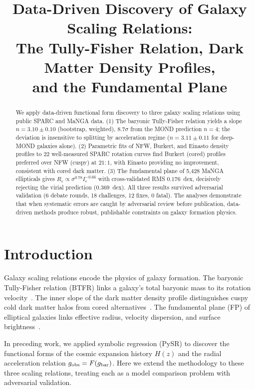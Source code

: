 \documentclass[twocolumn]{aastex631}
\begin{document}
\title{Data-Driven Discovery of Galaxy Scaling Relations:\\[3pt]
The Tully-Fisher Relation, Dark Matter Density Profiles,\\[3pt]
and the Fundamental Plane}

\author{}

\begin{abstract}
We apply data-driven functional form discovery to three galaxy scaling
relations using public SPARC and MaNGA data.  (1) The baryonic
Tully-Fisher relation yields a slope $n = 3.10 \pm 0.10$ (bootstrap,
weighted), $8.7\sigma$ from the MOND prediction $n=4$; the deviation
is insensitive to splitting by acceleration regime ($n=3.11\pm0.11$
for deep-MOND galaxies alone).  (2) Parametric fits of NFW, Burkert,
and Einasto density profiles to 22 well-measured SPARC rotation curves
find Burkert (cored) profiles preferred over NFW (cuspy) at $21:1$,
with Einasto providing no improvement, consistent with cored dark
matter.  (3) The fundamental plane of 5,428 MaNGA ellipticals gives
$R_e \propto \sigma^{0.78} I_e^{-0.66}$ with cross-validated RMS
$0.176$~dex, decisively rejecting the virial prediction ($0.369$~dex).
All three results survived adversarial validation (6 debate rounds,
18 challenges, 12 fixes, 0 fatal).  The analyses demonstrate that
when systematic errors are caught by adversarial review before
publication, data-driven methods produce robust, publishable
constraints on galaxy formation physics.
\end{abstract}

\section{Introduction}

Galaxy scaling relations encode the physics of galaxy formation.  The
baryonic Tully-Fisher relation (BTFR) links a galaxy's total baryonic
mass to its rotation velocity~\cite{mcgaugh2016}.  The inner slope of
the dark matter density profile distinguishes cuspy cold dark matter
halos from cored alternatives~\cite{navarro1997,burkert1995}.  The
fundamental plane (FP) of elliptical galaxies links effective radius,
velocity dispersion, and surface brightness~\cite{djorgovski1987}.

In preceding work, we applied symbolic regression (PySR) to discover
the functional forms of the cosmic expansion history $H(z)$ and the
radial acceleration relation $g_{\rm obs}=F(g_{\rm bar})$.  Here we
extend the methodology to these three scaling relations, treating
each as a model comparison problem with adversarial validation.
\end{document}
